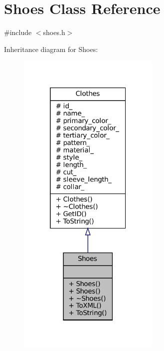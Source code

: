 \hypertarget{classShoes}{}\section{Shoes Class Reference}
\label{classShoes}


{\ttfamily \#include $<$shoes.\+h$>$}



Inheritance diagram for Shoes\+:\nopagebreak
\begin{figure}[H]
\begin{center}
\leavevmode
\includegraphics[width=193pt]{classShoes__inherit__graph}
\end{center}
\end{figure}


